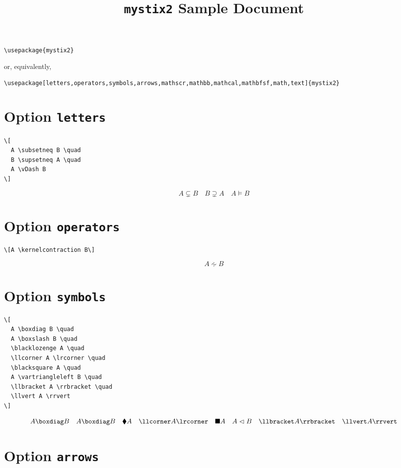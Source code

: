 \documentclass{article}
\begin{document}
\title{\texttt{mystix2} Sample Document}
\author{}
\date{}

\maketitle

\begin{verbatim}
\usepackage{mystix2}
\end{verbatim}
%
or, equivalently,
%
\begin{verbatim}
\usepackage[letters,operators,symbols,arrows,mathscr,mathbb,mathcal,mathbfsf,math,text]{mystix2}
\end{verbatim}

\section{Option \texttt{letters}}

\begin{verbatim}
\[
  A \subsetneq B \quad
  B \supsetneq A \quad
  A \vDash B
\]
\end{verbatim}
%
\[
  A \subsetneq B \quad
  B \supsetneq A \quad
  A \vDash B
\]

\section{Option \texttt{operators}}

\begin{verbatim}
\[A \kernelcontraction B\]
\end{verbatim}
%
\[A \kernelcontraction B\]

\section{Option \texttt{symbols}}

\begin{verbatim}
\[
  A \boxdiag B \quad
  A \boxslash B \quad
  \blacklozenge A \quad
  \llcorner A \lrcorner \quad
  \blacksquare A \quad
  A \vartriangleleft B \quad
  \llbracket A \rrbracket \quad
  \llvert A \rrvert
\]
\end{verbatim}
%
\[
  A \boxdiag B \quad
  A \boxslash B \quad
  \blacklozenge A \quad
  \llcorner A \lrcorner \quad
  \blacksquare A \quad
  A \vartriangleleft B \quad
  \llbracket A \rrbracket \quad
  \llvert A \rrvert
\]

\section{Option \texttt{arrows}}
\end{document}
